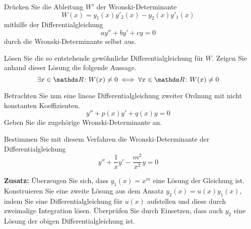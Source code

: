 \begin{atiTask}[
  title = Die Wronski-Determinante
]
  \begin{atiSubtasks}
    \item{
      Drücken Sie die Ableitung $W'$ der Wronski-Determinante
      \[
        W(x) = y_1(x)y'_2(x)-y_2(x)y'_1(x)
      \]
      mithilfe der Differentialgleichung
      \[
        ay'' + by' + cy = 0
      \]
      durch die Wronski-Determinante selbst aus.
    }
    \item{
      Lösen Sie die so entstehende gewöhnliche Differentialgleichung für $W$.
      Zeigen Sie anhand dieser Lösung die folgende Aussage.
      \[
        \exists x\in\setReal\colon W(x) \neq 0 \iff \forall x\in\setReal\colon W(x) \neq 0
      \]
    }
    \item{
      Betrachten Sie nun eine lineae Differentialgleichung zweiter Ordnung mit nicht konstanten Koeffizienten.
      \[
        y'' + p(x)y' + q(x)y = 0
      \]
      Geben Sie die zugehörige Wronski-Determinante an.
    }
    \item{
      Bestimmen Sie mit diesem Verfahren die Wronski-Determinante der Differentialgleichung
      \[
        y'' + \frac{1}{x}y' - \frac{m^2}{x^2}y = 0
      \]
    }
    \item{
      \textbf{Zusatz:}
      Überzeugen Sie sich, dass $y_1(x)=x^m$ eine Lösung der Gleichung ist.
      Konstruieren Sie eine zweite Lösung aus dem Ansatz $y_2(x) = u(x)y_1(x)$, indem Sie eine Differentialgleichung für $u(x)$ aufstellen und diese durch zweimalige Integration lösen.
      Überprüfen Sie durch Einsetzen, dass auch $y_2$ eine Lösung der obigen Differentialgleichung ist.
    }
  \end{atiSubtasks}
\end{atiTask}